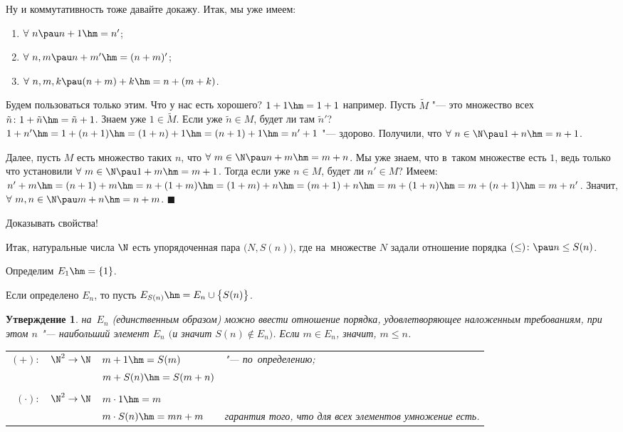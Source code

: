 \documentclass[a4paper,10pt,twoside]{article}
\newtheorem{Ut}{Утверждение}[section]
\newenvironment{Proof}
       {\par\noindent{\textbf{Доказательство.}}}
       {\hfill$\scriptstyle\blacksquare$}
\begin{document}
\begin{Proof} Ну и коммутативность тоже давайте докажу.
    Итак, мы уже имеем:

    \begin{enumerate}
        \item $\forall\  n \pau n+1\hm=n'$;

        \item $\forall\  n,m\pau n+m'\hm=(n+m)'$;

        \item $\forall\  n,m,k\pau (n+m)+k\hm=n+(m+k)$.
    \end{enumerate}

    Будем пользоваться только этим. Что у нас есть хорошего? $1+1\hm=1+1$ например.
     Пусть $\tilde M$ "--- это множество всех $\tilde n\colon 1+\tilde n\hm=\tilde n+1$. 
     Знаем уже $1\in \tilde M$. Если уже $\tilde n\in M$, будет ли там
      $\tilde n'$? $1+n'\hm=1+(n+1)\hm=(1+n)+1\hm=(n+1)+1\hm=n'+1$ "--- здорово.
       Получили, что $\forall\  n\in\N \pau 1+n\hm=n+1$.

    Далее, пусть $M$ есть множество таких $n$, что $\forall\  m\in \N\pau n+m\hm=m+n$. Мы уже знаем, что в~таком множестве есть $1$, ведь только что установили $\forall\  m\in \N\pau  1+m\hm=m+1$. Тогда если уже $n\in M$, будет ли $n'\in M$? Имеем: $n'+m\hm=(n+1)+m\hm=n+(1+m)\hm=(1+m)+n\hm=(m+1)+n\hm=m+(1+n)\hm=m+(n+1)\hm=m+n'$. Значит, $\forall\  m,n\in \N\pau m+n\hm=n+m$.
\end{Proof}

Доказывать свойства!

Итак, натуральные числа $\N$ есть упорядоченная пара $\big(N,S(n)\big)$,
где на~множестве $N$ задали отношение порядка
$ (\leq)\colon\pau n\leq S(n)$.

Определим $E_1\hm=\{1\}$.

Если определено $E_n$, то пусть $E_{S(n)}\hm=E_n\cup\big\{S(n)\big\}$.

\begin{Ut}
    на~$E_n$ (единственным образом) можно ввести отношение порядка,
     удовлетворяющее наложенным требованиям, при этом $n$ "--- наибольший элемент $E_n$ $\big($и значит $S(n)\nin E_n\big)$.
      Если $m\in E_n$, значит, $m\leq n$.

    \begin{tabular}{rlll}
        $(+)\colon$&$\N^2\to\N$&$m+1\hm=S(m)$&"--- по~определению;\\
               &         &$m+S(n)\hm=S(m+n)$\\ \\
        $(\cdot)\colon$&$\N^2\to\N$&$m\cdot1\hm=m$\\
        & &$m\cdot S(n)\hm=mn+m$&гарантия того, что для всех элементов умножение есть.
    \end{tabular}
\end{Ut}
\end{document}
